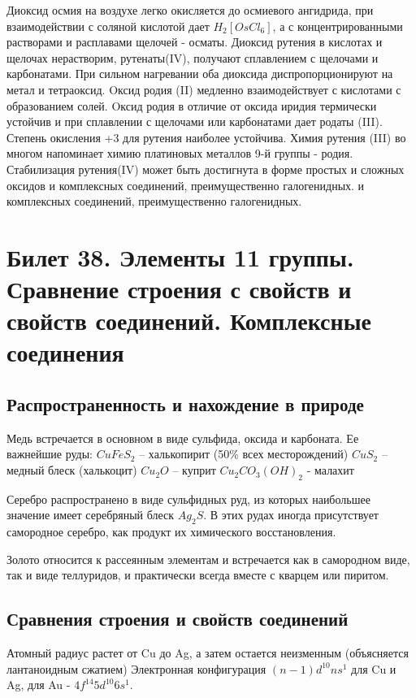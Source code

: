 \documentclass[11pt]{article}
\begin{document}
Диоксид осмия на воздухе легко окисляется до осмиевого ангидрида, при взаимодействии
с соляной кислотой дает $H_2[OsCl_6]$, а с концентрированными растворами и расплавами
щелочей - осматы. Диоксид рутения в кислотах и щелочах нерастворим, рутенаты(IV),
получают сплавлением с щелочами и карбонатами. При сильном нагревании оба диоксида
диспропорционируют на метал и тетраоксид. 
Oксид родия (II) медленно
взаимодействует с кислотами с образованием солей. Oксид родия в отличие от оксида
иридия термически устойчив и при сплавлении с щелочами или карбонатами дает родаты
(III). Степень окисления +3 для рутения наиболее устойчива. Химия рутения (III) во
многом напоминает химию платиновых металлов 9-й группы - родия. Стабилизация
рутения(IV) может быть достигнута в форме простых и сложных оксидов и комплексных
соединений, преимущественно галогенидных. и комплексных соединений,
преимущественно галогенидных.


\section{Билет  38. Элементы 11 группы. Сравнение строения с свойств и свойств соединений. Комплексные соединения}

\subsection{Распространенность и нахождение в природе}
Медь встречается в основном в виде сульфида, оксида и карбоната. Ее важнейшие
руды:
$CuFeS_2$ – халькопирит (50\% всех месторождений)
$CuS_2$ – медный блеск (халькоцит)
$Cu_2O$ – куприт
$Cu_2CO_3(OH)_2$ - малахит

Серебро распространено в виде сульфидных руд, из которых наибольшее значение
имеет серебряный блеск $Ag_2S$. В этих рудах иногда присутствует самородное серебро, как
продукт их химического восстановления.

Золото относится к рассеянным элементам и встречается как в самородном виде,
так и виде теллуридов, и практически всегда вместе с кварцем или пиритом.

\subsection{Сравнения строения и свойств соединений}

Атомный радиус растет от Cu до Ag, а затем остается неизменным (объясняется лантаноидным сжатием)
Электронная конфигурация $(n-1)d^{10}ns^1$ для Cu и Ag, для Au - $4f^{14}5d^{10}6s^1$.
\end{document}
